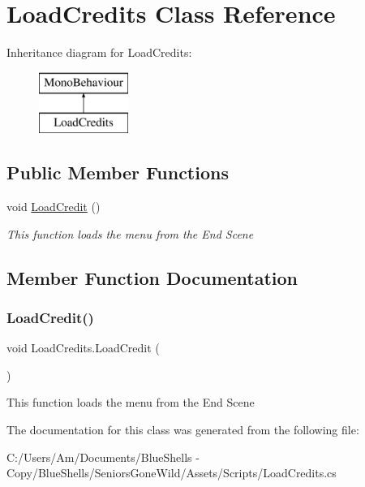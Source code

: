\hypertarget{class_load_credits}{}\section{Load\+Credits Class Reference}
\label{class_load_credits}
Inheritance diagram for Load\+Credits\+:\begin{figure}[H]
\begin{center}
\leavevmode
\includegraphics[height=2.000000cm]{class_load_credits}
\end{center}
\end{figure}
\subsection*{Public Member Functions}
\begin{DoxyCompactItemize}
\item 
void \mbox{\hyperlink{class_load_credits_a5a96d132e7cdd4240bb6c596a2e6b3dd}{Load\+Credit}} ()
\begin{DoxyCompactList}\small\item\em This function loads the menu from the End Scene \end{DoxyCompactList}\end{DoxyCompactItemize}


\subsection{Member Function Documentation}
\mbox{\label{class_load_credits_a5a96d132e7cdd4240bb6c596a2e6b3dd}} 
\subsubsection{\texorpdfstring{Load\+Credit()}{LoadCredit()}}
{\footnotesize\ttfamily void Load\+Credits.\+Load\+Credit (\begin{DoxyParamCaption}{ }\end{DoxyParamCaption})}



This function loads the menu from the End Scene 



The documentation for this class was generated from the following file\+:\begin{DoxyCompactItemize}
\item 
C\+:/\+Users/\+Am/\+Documents/\+Blue\+Shells -\/ Copy/\+Blue\+Shells/\+Seniors\+Gone\+Wild/\+Assets/\+Scripts/Load\+Credits.\+cs\end{DoxyCompactItemize}

